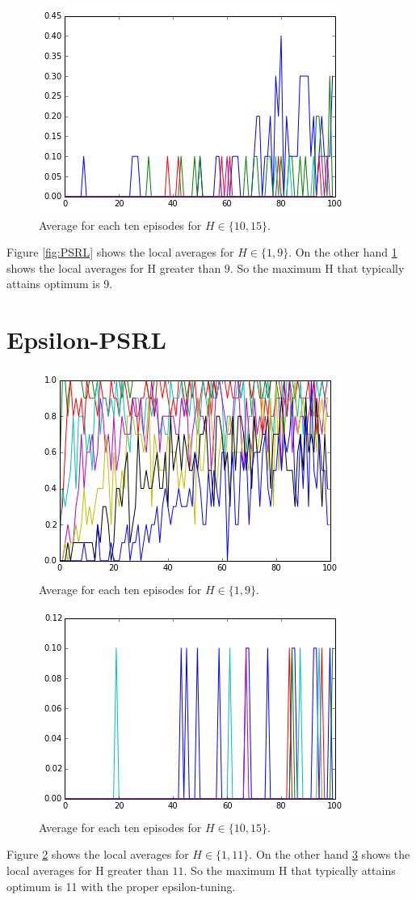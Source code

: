 \documentclass[12pt]{article}
\begin{document}
\begin{figure}[h]
\centering
\includegraphics[scale=.4]{Average_Last_Ten_PSRL_rest.png}
\caption{Average for each ten episodes for $H\in\{10,15\}$.}
\label{fig:PSRL_rest}
\end{figure}

Figure \ref{fig:PSRL} shows the local averages for $H\in\{1,9\}$. On the other hand \ref{fig:PSRL_rest} shows the local averages for H greater than $9$. So the maximum H that typically attains optimum is 9. 
\section{Epsilon-PSRL}
\begin{figure}[h]
\centering
\includegraphics[scale=.4]{Average_Last_Ten_eps.png}
\caption{Average for each ten episodes for $H\in\{1,9\}$.}
\label{fig:eps}
\end{figure}

\begin{figure}[h]
\centering
\includegraphics[scale=.4]{Average_Last_Ten_eps_rest.png}
\caption{Average for each ten episodes for $H\in\{10,15\}$.}
\label{fig:eps_rest}
\end{figure}

Figure \ref{fig:eps} shows the local averages for $H\in\{1,11\}$. On the other hand \ref{fig:eps_rest} shows the local averages for H greater than $11$. So the maximum H that typically attains optimum is 11 with the proper epsilon-tuning. 
\end{document}
